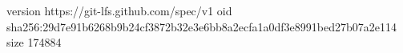 version https://git-lfs.github.com/spec/v1
oid sha256:29d7e91b6268b9b24cf3872b32e3e6bb8a2ecfa1a0df3e8991bed27b07a2e114
size 174884
